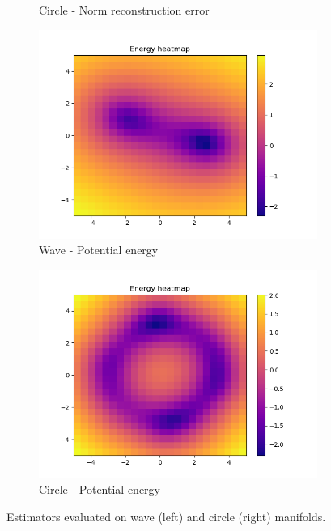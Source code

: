 \begin{figure}[!h]
\begin{subfigure}{.5\textwidth}
  \caption{Circle - Norm reconstruction error}
\end{subfigure}
\begin{subfigure}{.5\textwidth}
  \centering
  \includegraphics[width=.95\linewidth]{figures/wave-quantifier-energy}
  \caption{Wave - Potential energy}
\end{subfigure}%
\begin{subfigure}{.5\textwidth}
  \centering
  \includegraphics[width=.95\linewidth]{figures/circle-quantifier-energy}
  \caption{Circle - Potential energy}
\end{subfigure}
\caption[Heatmap of estimators on wave and circle manifold]{Estimators evaluated on wave (left) and circle (right) manifolds.}
\label{fig:exp1-heatmaps}
\end{figure}


